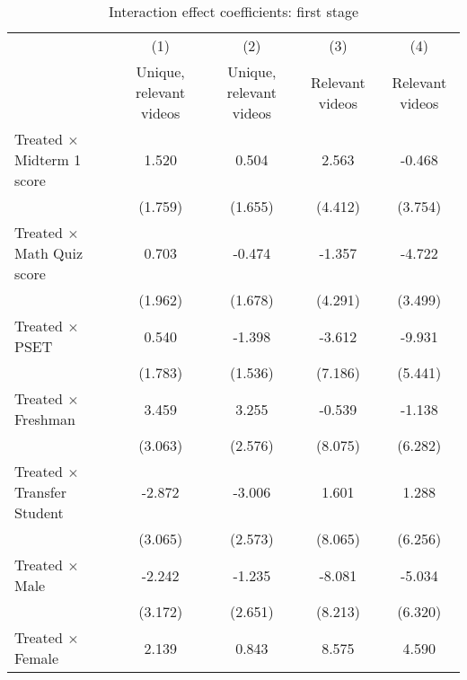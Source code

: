 \begin{table}[htbp] \centering \begin{threeparttable} \def\sym#1{\ifmmode^{#1}\else\(^{#1}\)\fi} \caption{Interaction effect coefficients: first stage} \begin{tabular}{l*{4}{c}} \toprule 
                    &\multicolumn{1}{c}{(1)}&\multicolumn{1}{c}{(2)}&\multicolumn{1}{c}{(3)}&\multicolumn{1}{c}{(4)}\\
                    &\multicolumn{1}{c}{Unique, relevant videos}&\multicolumn{1}{c}{Unique, relevant videos}&\multicolumn{1}{c}{Relevant videos}&\multicolumn{1}{c}{Relevant videos}\\
\midrule
Treated $\times$ Midterm 1 score&       1.520         &       0.504         &       2.563         &      -0.468         \\
                    &     (1.759)         &     (1.655)         &     (4.412)         &     (3.754)         \\
[1em]
Treated $\times$ Math Quiz score&       0.703         &      -0.474         &      -1.357         &      -4.722         \\
                    &     (1.962)         &     (1.678)         &     (4.291)         &     (3.499)         \\
[1em]
Treated $\times$ PSET&       0.540         &      -1.398         &      -3.612         &      -9.931         \\
                    &     (1.783)         &     (1.536)         &     (7.186)         &     (5.441)         \\
[1em]
Treated $\times$ Freshman&       3.459         &       3.255         &      -0.539         &      -1.138         \\
                    &     (3.063)         &     (2.576)         &     (8.075)         &     (6.282)         \\
[1em]
Treated $\times$ Transfer Student&      -2.872         &      -3.006         &       1.601         &       1.288         \\
                    &     (3.065)         &     (2.573)         &     (8.065)         &     (6.256)         \\
[1em]
Treated $\times$ Male&      -2.242         &      -1.235         &      -8.081         &      -5.034         \\
                    &     (3.172)         &     (2.651)         &     (8.213)         &     (6.320)         \\
[1em]
Treated $\times$ Female&       2.139         &       0.843         &       8.575         &       4.590         \\

\end{tabular}
\end{threeparttable}
\end{table}
